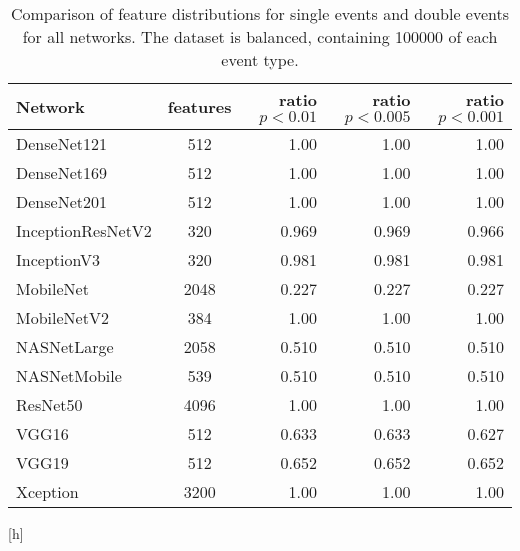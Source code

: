 \begin{table}[h]
    \begin{tabular}{l|c|r|r|r}
	\hline
	 Network           &   features &   ratio $p < 0.01$ &   ratio $p < 0.005$ &   ratio $p < 0.001$ \\
	\hline
	 DenseNet121       &            512 &         1.00  &          1.00   &          1.00   \\
	 DenseNet169       &            512 &         1.00  &          1.00   &          1.00   \\
	 DenseNet201       &            512 &         1.00  &          1.00   &          1.00   \\
	 InceptionResNetV2 &            320 &         0.969 &          0.969  &          0.966  \\
	 InceptionV3       &            320 &         0.981 &          0.981  &          0.981  \\
	 MobileNet         &           2048 &         0.227 &          0.227  &          0.227  \\
	 MobileNetV2       &            384 &         1.00  &          1.00   &          1.00   \\
	 NASNetLarge       &           2058 &         0.510 &          0.510  &          0.510  \\
	 NASNetMobile      &            539 &         0.510 &          0.510  &          0.510  \\
	 ResNet50          &           4096 &         1.00  &          1.00   &          1.00   \\
	 VGG16             &            512 &         0.633 &          0.633  &          0.627  \\
	 VGG19             &            512 &         0.652 &          0.652  &          0.652  \\
	 Xception          &           3200 &         1.00  &          1.00   &          1.00   \\
	\hline
    \end{tabular}
    \caption{Comparison of feature distributions for single events and double events for all networks.
    The dataset is balanced, containing 100000 of each event type.}
    \label{tab:features}
\end{table}[h]
